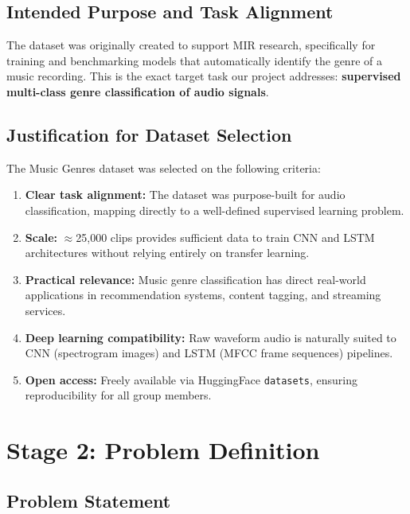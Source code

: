\documentclass[12pt, a4paper]{article}
\begin{document}
\subsection{Intended Purpose and Task Alignment}

The dataset was originally created to support MIR research, specifically for training
and benchmarking models that automatically identify the genre of a music recording. This
is the exact target task our project addresses: \textbf{supervised multi-class genre
classification of audio signals}.

\subsection{Justification for Dataset Selection}

The Music Genres dataset was selected on the following criteria:

\begin{enumerate}[noitemsep, topsep=2pt]
    \item \textbf{Clear task alignment:} The dataset was purpose-built for audio
          classification, mapping directly to a well-defined supervised learning problem.
    \item \textbf{Scale:} $\approx$25{,}000 clips provides sufficient data to train
          CNN and LSTM architectures without relying entirely on transfer learning.
    \item \textbf{Practical relevance:} Music genre classification has direct real-world
          applications in recommendation systems, content tagging, and streaming services.
    \item \textbf{Deep learning compatibility:} Raw waveform audio is naturally suited to
          CNN (spectrogram images) and LSTM (MFCC frame sequences) pipelines.
    \item \textbf{Open access:} Freely available via HuggingFace \texttt{datasets},
          ensuring reproducibility for all group members.
\end{enumerate}

\section{Stage 2: Problem Definition}
\label{sec:problem}

\subsection{Problem Statement}
\end{document}
